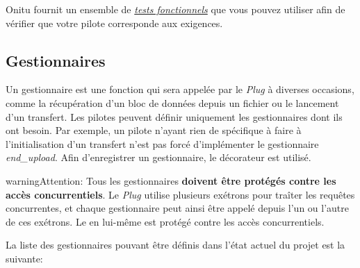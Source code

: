 \documentclass[letterpaper,10pt,english]{sphinxmanual}
\begin{document}
Onitu fournit un ensemble de {\hyperref[contribute:tests]{\emph{tests fonctionnels}}} que vous pouvez utiliser afin de vérifier que votre pilote corresponde aux exigences.


\subsection{Gestionnaires}
\label{drivers:id1}\label{drivers:handlers}
Un gestionnaire est une fonction qui sera appelée par le \emph{Plug} à diverses occasions, comme la récupération d'un bloc de données depuis un fichier ou le lancement d'un transfert. Les pilotes peuvent définir uniquement les gestionnaires dont ils ont besoin. Par exemple, un pilote n'ayant rien de spécifique à faire à l'initialisation d'un transfert n'est pas forcé d'implémenter le gestionnaire \emph{end\_upload}. Afin d'enregistrer un gestionnaire, le décorateur {\hyperref[drivers:onitu.api.Plug.handler]{}} est utilisé.

\begin{notice}{warning}{Attention:}
Tous les gestionnaires \textbf{doivent être protégés contre les accès concurrentiels}. Le \emph{Plug} utilise plusieurs exétrons pour traîter les requêtes concurrentes, et chaque gestionnaire peut ainsi être appelé depuis l'un ou l'autre de ces exétrons. Le {\hyperref[drivers:onitu.api.Plug]{}} en lui-même est protégé contre les accès concurrentiels.
\end{notice}

La liste des gestionnaires pouvant être définis dans l'état actuel du projet est la suivante:
\end{document}
